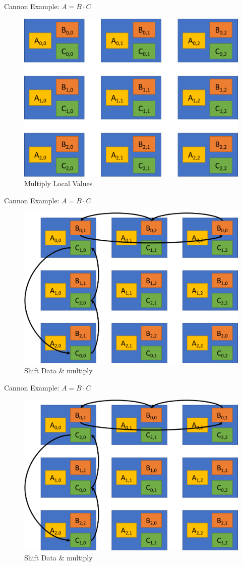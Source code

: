 \documentclass[10pt]{beamer}
\begin{document}
\begin{frame}{Cannon Example: $A = B \cdot C$}
	\begin{figure}	
		\centering
		\includegraphics[width=0.72\linewidth]{figures/cannon_start.png}
		\caption{Multiply Local Values}
	\end{figure}
\end{frame}

\begin{frame}{Cannon Example: $A = B \cdot C$}
	\begin{figure}	
		\centering
		\includegraphics[width=0.72\linewidth]{figures/cannon_first_iteration.png}
		\caption{Shift Data \& multiply}
	\end{figure}
\end{frame}

\begin{frame}{Cannon Example: $A = B \cdot C$}
\begin{figure}	
	\centering
	\includegraphics[width=0.72\linewidth]{figures/cannon_second_iteration.png}
	\caption{Shift Data \& multiply}
\end{figure}
\end{frame}
\end{document}
